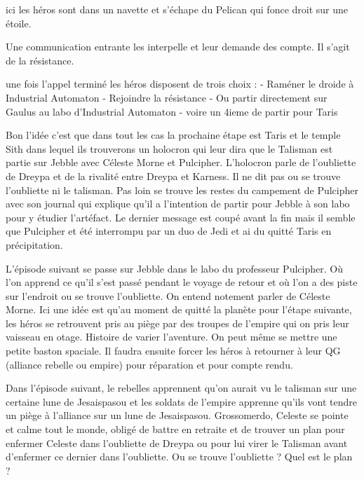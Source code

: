 ici les héros sont dans un navette et s'échape du Pelican qui fonce droit sur une étoile.

Une communication entrante les interpelle et leur demande des compte. Il s'agit de la résistance.

une fois l'appel terminé les héros disposent de trois choix :
 - Raméner le droide à Industrial Automaton
 - Rejoindre la résistance
 - Ou partir directement sur Gaulus au labo d'Industrial Automaton
 - voire un 4ieme de partir pour Taris

Bon l'idée c'est que dans tout les cas la prochaine étape est Taris et le temple Sith dans lequel ils trouverons un holocron qui leur dira que le Talisman est partie sur Jebble avec Céleste Morne et Pulcipher.
L'holocron parle de l'oubliette de Dreypa et de la rivalité entre Dreypa et Karness. Il ne dit pas ou se trouve l'oubliette ni le talisman. 
Pas loin se trouve les restes du campement de Pulcipher avec son journal qui explique qu'il a l'intention de partir pour Jebble à son labo pour y étudier l'artéfact. Le dernier message est coupé avant la fin mais il semble que Pulcipher et été interrompu par un duo de Jedi et ai du quitté Taris en précipitation.


L'épisode suivant se passe sur Jebble dans le labo du professeur Pulcipher. Où l'on apprend ce qu'il s'est passé pendant le voyage de retour et où l'on a des piste sur l'endroit ou se trouve l'oubliette. On entend notement parler de Céleste Morne.
Ici une idée est qu'au moment de quitté la planète pour l'étape suivante, les héros se retrouvent pris au piège par des troupes de l'empire qui on pris leur vaisseau en otage. Histoire de varier l'aventure. On peut même se mettre une petite baston spaciale.
Il faudra ensuite forcer les héros à retourner à leur QG (alliance rebelle ou empire) pour réparation et pour compte rendu.

Dans l'épisode suivant, le rebelles apprennent qu'on aurait vu le talisman sur une certaine lune de Jesaispasou et les soldats de l'empire apprenne qu'ils vont tendre un piège à l'alliance sur un lune de Jesaispasou.
Grossomerdo, Celeste se pointe et calme tout le monde, obligé de battre en retraite et de trouver un plan pour enfermer Celeste dans l'oubliette de Dreypa ou pour lui virer le Talisman avant d'enfermer ce dernier dans l'oubliette. Ou se trouve l'oubliette ? Quel est le plan ?